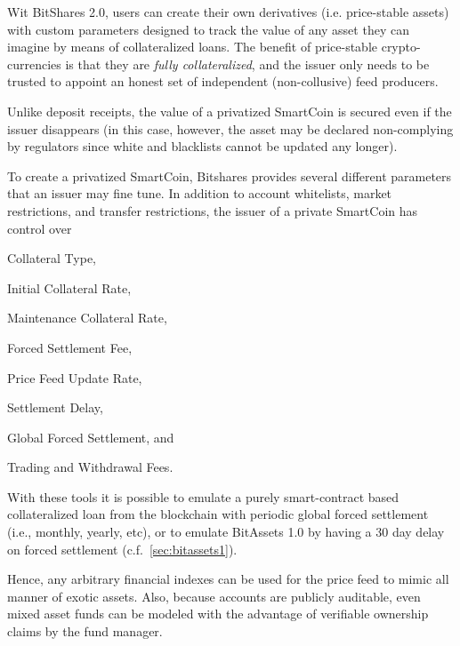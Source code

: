 \label{sec:uia:priv}

Wit BitShares 2.0, users can create their own derivatives (i.e. price-stable
assets) with custom parameters designed to track the value of any
asset they can imagine by means of collateralized loans. The benefit of
price-stable crypto-currencies is that they are \emph{fully collateralized},
and the issuer only needs to be trusted to appoint an honest set of independent
(non-collusive) feed producers. 

Unlike deposit receipts, the value of a privatized SmartCoin is secured even if
the issuer disappears (in this case, however, the asset may be declared
non-complying by regulators since white and blacklists cannot be updated any
longer).

To create a privatized SmartCoin, Bitshares provides several different
parameters that an issuer may fine tune. In addition to account whitelists,
market restrictions, and transfer restrictions, the issuer of a private
SmartCoin has control over
\begin{inparaenum}[(a)]
 \item Collateral Type,
 \item Initial Collateral Rate,
 \item Maintenance Collateral Rate,
 \item Forced Settlement Fee, 
 \item Price Feed Update Rate,
 \item Settlement Delay, %
 \item Global Forced Settlement, and
 \item Trading and Withdrawal Fees.
\end{inparaenum}

With these tools it is possible to emulate a purely smart-contract based
collateralized loan from the blockchain with periodic global forced settlement
(i.e., monthly, yearly, etc), or to emulate BitAssets 1.0 by having a 30 day
delay on forced settlement (c.f.~\cref{sec:bitassets1}).

Hence, any arbitrary financial indexes can be used for the price feed to mimic
all manner of exotic assets. Also, because accounts are publicly auditable,
even mixed asset funds can be modeled with the advantage of verifiable
ownership claims by the fund manager.
